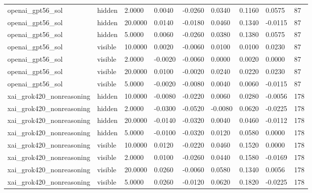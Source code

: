 \begin{tabular}{lllllllll}
openai\_gpt56\_sol & hidden & 2.0000 & 0.0040 & -0.0260 & 0.0340 & 0.1160 & 0.0575 & 87 \\
openai\_gpt56\_sol & hidden & 20.0000 & 0.0140 & -0.0180 & 0.0460 & 0.1340 & -0.0115 & 87 \\
openai\_gpt56\_sol & hidden & 5.0000 & 0.0060 & -0.0260 & 0.0380 & 0.1380 & 0.0575 & 87 \\
openai\_gpt56\_sol & visible & 10.0000 & 0.0020 & -0.0060 & 0.0100 & 0.0100 & 0.0230 & 87 \\
openai\_gpt56\_sol & visible & 2.0000 & -0.0020 & -0.0060 & 0.0000 & 0.0020 & 0.0000 & 87 \\
openai\_gpt56\_sol & visible & 20.0000 & 0.0100 & -0.0020 & 0.0240 & 0.0220 & 0.0230 & 87 \\
openai\_gpt56\_sol & visible & 5.0000 & -0.0020 & -0.0080 & 0.0040 & 0.0060 & -0.0115 & 87 \\
xai\_grok420\_nonreasoning & hidden & 10.0000 & -0.0080 & -0.0220 & 0.0060 & 0.0280 & -0.0056 & 178 \\
xai\_grok420\_nonreasoning & hidden & 2.0000 & -0.0300 & -0.0520 & -0.0080 & 0.0620 & -0.0225 & 178 \\
xai\_grok420\_nonreasoning & hidden & 20.0000 & -0.0140 & -0.0320 & 0.0040 & 0.0460 & -0.0112 & 178 \\
xai\_grok420\_nonreasoning & hidden & 5.0000 & -0.0100 & -0.0320 & 0.0120 & 0.0580 & 0.0000 & 178 \\
xai\_grok420\_nonreasoning & visible & 10.0000 & 0.0120 & -0.0220 & 0.0460 & 0.1520 & 0.0000 & 178 \\
xai\_grok420\_nonreasoning & visible & 2.0000 & 0.0100 & -0.0260 & 0.0440 & 0.1580 & -0.0169 & 178 \\
xai\_grok420\_nonreasoning & visible & 20.0000 & 0.0260 & -0.0060 & 0.0580 & 0.1340 & 0.0056 & 178 \\
xai\_grok420\_nonreasoning & visible & 5.0000 & 0.0260 & -0.0120 & 0.0620 & 0.1820 & -0.0225 & 178 \\
\bottomrule
\end{tabular}
